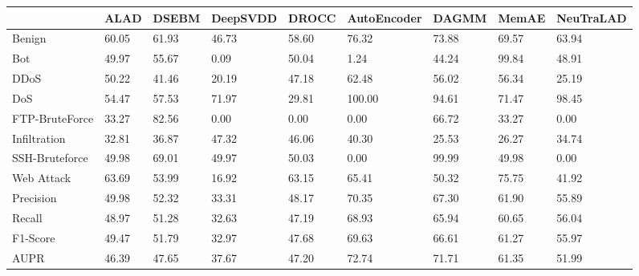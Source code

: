 \begin{tabular}{lllllllll}
\toprule
{} &   ALAD &  DSEBM & DeepSVDD &  DROCC & AutoEncoder &  DAGMM &  MemAE & NeuTraLAD \\
\midrule
Benign         &  60.05 &  61.93 &    46.73 &  58.60 &       76.32 &  73.88 &  69.57 &     63.94 \\
Bot            &  49.97 &  55.67 &     0.09 &  50.04 &        1.24 &  44.24 &  99.84 &     48.91 \\
DDoS           &  50.22 &  41.46 &    20.19 &  47.18 &       62.48 &  56.02 &  56.34 &     25.19 \\
DoS            &  54.47 &  57.53 &    71.97 &  29.81 &      100.00 &  94.61 &  71.47 &     98.45 \\
FTP-BruteForce &  33.27 &  82.56 &     0.00 &   0.00 &        0.00 &  66.72 &  33.27 &      0.00 \\
Infiltration   &  32.81 &  36.87 &    47.32 &  46.06 &       40.30 &  25.53 &  26.27 &     34.74 \\
SSH-Bruteforce &  49.98 &  69.01 &    49.97 &  50.03 &        0.00 &  99.99 &  49.98 &      0.00 \\
Web Attack     &  63.69 &  53.99 &    16.92 &  63.15 &       65.41 &  50.32 &  75.75 &     41.92 \\
Precision      &  49.98 &  52.32 &    33.31 &  48.17 &       70.35 &  67.30 &  61.90 &     55.89 \\
Recall         &  48.97 &  51.28 &    32.63 &  47.19 &       68.93 &  65.94 &  60.65 &     56.04 \\
F1-Score       &  49.47 &  51.79 &    32.97 &  47.68 &       69.63 &  66.61 &  61.27 &     55.97 \\
AUPR           &  46.39 &  47.65 &    37.67 &  47.20 &       72.74 &  71.71 &  61.35 &     51.99 \\
\bottomrule
\end{tabular}
